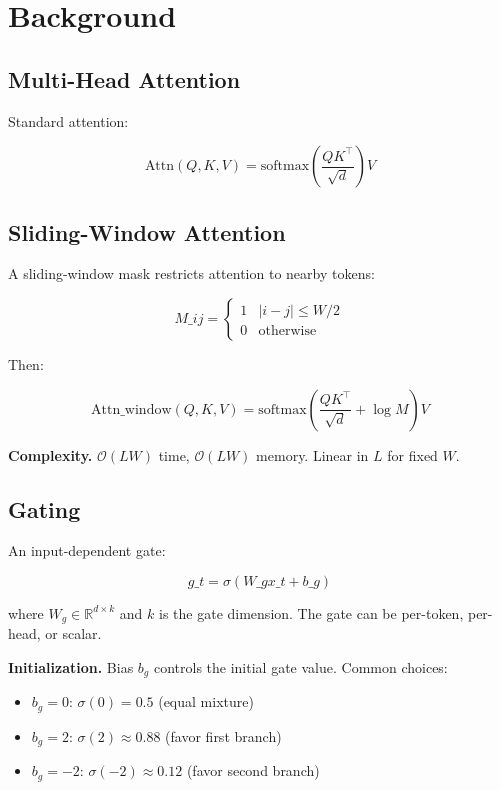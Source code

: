 
\section{Background}

\subsection{Multi-Head Attention}

Standard attention:

\[
\text{Attn}(Q, K, V) = \text{softmax}\!\left(\frac{QK^\top}{\sqrt{d}}\right)V
\tag{3.1}
\]

\subsection{Sliding-Window Attention}

A sliding-window mask restricts attention to nearby tokens:

\[
M\_{ij} = \begin{cases} 1 & |i - j| \leq W/2 \\ 0 & \text{otherwise} \end{cases}
\tag{3.2}
\]

Then:

\[
\text{Attn}\_\text{window}(Q, K, V) = \text{softmax}\!\left(\frac{QK^\top}{\sqrt{d}} + \log M\right)V
\tag{3.3}
\]

\textbf{Complexity.} $\mathcal{O}(L W)$ time, $\mathcal{O}(L W)$ memory. Linear 
in $L$ for fixed $W$.

\subsection{Gating}

An input-dependent gate:

\[
g\_t = \sigma(W\_g x\_t + b\_g)
\tag{3.4}
\]

where $W_g \in \mathbb{R}^{d \times k}$ and $k$ is the gate dimension. 
The gate can be per-token, per-head, or scalar.

\textbf{Initialization.} Bias $b_g$ controls the initial gate value. Common choices:
\begin{itemize}
\item $b_g = 0$: $\sigma(0) = 0.5$ (equal mixture)
\item $b_g = 2$: $\sigma(2) \approx 0.88$ (favor first branch)
\item $b_g = -2$: $\sigma(-2) \approx 0.12$ (favor second branch)

\end{itemize}
